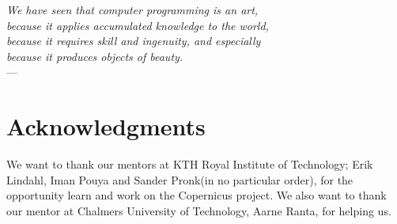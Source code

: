 
\begin{flushright}{\slshape    
    We have seen that computer programming is an art, \\ 
    because it applies accumulated knowledge to the world, \\ 
    because it requires skill and ingenuity, and especially \\
    because it produces objects of beauty.} \\ \medskip
    ---  \citep{knuth:1974}
\end{flushright}



\bigskip

\begingroup
\let\clearpage\relax
\let\cleardoublepage\relax
\let\cleardoublepage\relax
\chapter*{Acknowledgments}
We want to thank our mentors at KTH Royal Institute of Technology;
Erik Lindahl, Iman Pouya and Sander Pronk(in no particular order), for
the opportunity learn and work on the Copernicus project. We also want
to thank our mentor at Chalmers University of Technology, Aarne Ranta,
for helping us.

\endgroup




